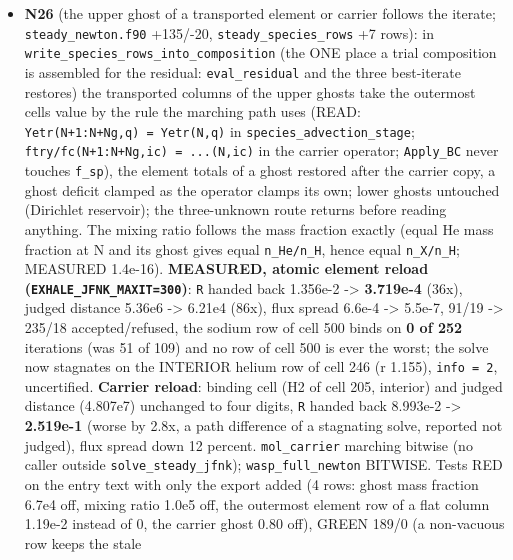 \documentclass[english,a4paper]{my_memo}
\begin{document}
\begin{itemize}
  distance while the control is \texttt{\textbar{}\textbar{}R\textbar{}\textbar{}} (the two rank iterates differently,
  which limits the comparisons).
\item
  \textbf{N26} (the upper ghost of a transported element or carrier follows the
  iterate; \texttt{steady\_newton.f90} +135/-20, \texttt{steady\_species\_rows} +7 rows): in
  \texttt{write\_species\_rows\_into\_composition} (the ONE place a trial composition is
  assembled for the residual: \texttt{eval\_residual} and the three best-iterate
  restores) the transported columns of the upper ghosts take the outermost
  cell\textquotesingle s value by the rule the marching path uses (READ: \texttt{Yetr(N+1:N+Ng,q)\ =\ Yetr(N,q)} in \texttt{species\_advection\_stage}; \texttt{ftry/fc(N+1:N+Ng,ic)\ =\ ...(N,ic)}
  in the carrier operator; \texttt{Apply\_BC} never touches \texttt{f\_sp}), the element
  totals of a ghost restored after the carrier copy, a ghost deficit clamped
  as the operator clamps its own; lower ghosts untouched (Dirichlet
  reservoir); the three-unknown route returns before reading anything. The
  mixing ratio follows the mass fraction exactly (equal He mass fraction at
  N and its ghost gives equal \texttt{n\_He/n\_H}, hence equal \texttt{n\_X/n\_H}; MEASURED
  1.4e-16). \textbf{MEASURED, atomic element reload (\texttt{EXHALE\_JFNK\_MAXIT=300})}:
  \texttt{\textbar{}\textbar{}R\textbar{}\textbar{}} handed back 1.356e-2 -\textgreater{} \textbf{3.719e-4} (36x), judged distance
  5.36e6 -\textgreater{} 6.21e4 (86x), flux spread 6.6e-4 -\textgreater{} 5.5e-7, 91/19 -\textgreater{} 235/18
  accepted/refused, the sodium row of cell 500 binds on \textbf{0 of 252}
  iterations (was 51 of 109) and no row of cell 500 is ever the worst; the
  solve now stagnates on the INTERIOR helium row of cell 246 (r 1.155),
  \texttt{info\ =\ 2}, uncertified. \textbf{Carrier reload}: binding cell (H2 of cell 205,
  interior) and judged distance (4.807e7) unchanged to four digits, \texttt{\textbar{}\textbar{}R\textbar{}\textbar{}}
  handed back 8.993e-2 -\textgreater{} \textbf{2.519e-1} (worse by 2.8x, a path difference of a
  stagnating solve, reported not judged), flux spread down 12 percent.
  \texttt{mol\_carrier} marching bitwise (no caller outside \texttt{solve\_steady\_jfnk});
  \texttt{wasp\_full\_newton} BITWISE. Tests RED on the entry text with only the
  export added (4 rows: ghost mass fraction 6.7e4 off, mixing ratio 1.0e5
  off, the outermost element row of a flat column 1.19e-2 instead of 0, the
  carrier ghost 0.80 off), GREEN 189/0 (a non-vacuous row keeps the stale

\end{itemize}
\end{document}
